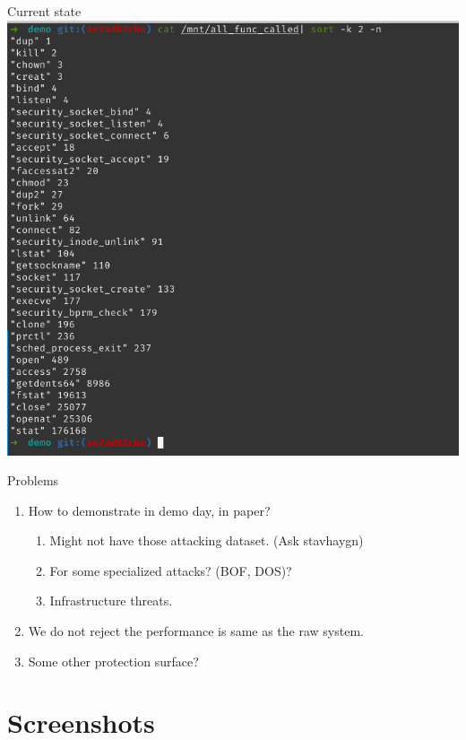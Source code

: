 \documentclass{beamer}
\begin{document}
\begin{CJK*}{UTF8}{bsmi}
  \begin{frame}{Current state}
    \centering
    \includegraphics[height=.8\textheight]{Screenshot_2021-09-10_15-15-13.png}
  \end{frame}

  \begin{frame}{Problems}
    \begin{enumerate}
      \item How to demonstrate in {\color{blue} demo day}, in {\color{blue} paper}?
            \begin{enumerate}
              \item Might not have those attacking dataset. (Ask stavhaygn)
              \item For some specialized attacks? (BOF, DOS)?
              \item Infrastructure threats.
            \end{enumerate}
      \item We do not reject the performance is same as the raw system.
      \item Some other protection surface?
    \end{enumerate}
  \end{frame}

  \section{Screenshots}


\end{CJK*}
\end{document}
